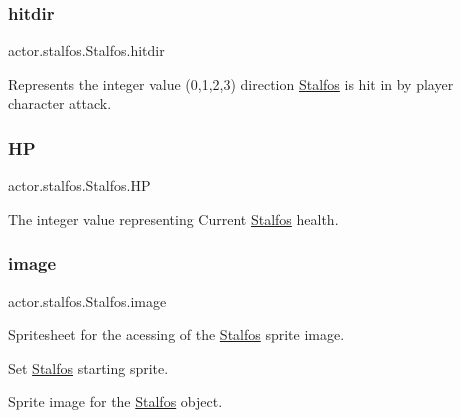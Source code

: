 \subsubsection{\texorpdfstring{hitdir}{hitdir}}
{\footnotesize\ttfamily actor.\+stalfos.\+Stalfos.\+hitdir}



Represents the integer value (0,1,2,3) direction \hyperlink{classactor_1_1stalfos_1_1_stalfos}{Stalfos} is hit in by player character attack. 

\mbox{\label{classactor_1_1stalfos_1_1_stalfos_adff362c2a85501a23a65192fe991af3d}} 
\subsubsection{\texorpdfstring{HP}{HP}}
{\footnotesize\ttfamily actor.\+stalfos.\+Stalfos.\+HP}



The integer value representing Current \hyperlink{classactor_1_1stalfos_1_1_stalfos}{Stalfos} health. 

\mbox{\label{classactor_1_1stalfos_1_1_stalfos_a138d42da7f7b1333cc3739642c55673d}} 
\subsubsection{\texorpdfstring{image}{image}}
{\footnotesize\ttfamily actor.\+stalfos.\+Stalfos.\+image}



Spritesheet for the acessing of the \hyperlink{classactor_1_1stalfos_1_1_stalfos}{Stalfos} sprite image. 

Set \hyperlink{classactor_1_1stalfos_1_1_stalfos}{Stalfos} starting sprite.

Sprite image for the \hyperlink{classactor_1_1stalfos_1_1_stalfos}{Stalfos} object. \mbox{\label{classactor_1_1stalfos_1_1_stalfos_a60385857eaf3f3b7aacc4bec982223eb}} 
